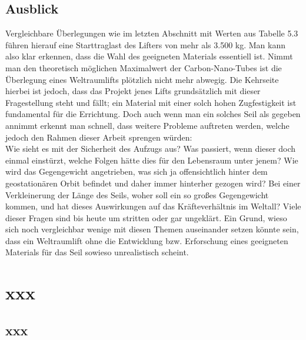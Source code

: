 \documentclass[a4paper, 10pt]{report}
\begin{document}
\section{Ausblick}
Vergleichbare Überlegungen wie im letzten Abschnitt mit Werten aus Tabelle 5.3 führen hierauf eine Starttraglast des Lifters von mehr als 3.500 kg. Man kann also klar erkennen, dass die Wahl des geeigneten Materials essentiell ist. Nimmt man den theoretisch möglichen Maximalwert der Carbon-Nano-Tubes ist die Überlegung eines Weltraumlifts plötzlich nicht mehr abwegig. Die Kehrseite hierbei ist jedoch, dass das Projekt jenes Lifts grundsätzlich mit dieser Fragestellung steht und fällt; ein Material mit einer solch hohen Zugfestigkeit ist fundamental für die Errichtung. Doch auch wenn man ein solches Seil als gegeben annimmt erkennt man schnell, dass weitere Probleme auftreten werden, welche jedoch den Rahmen dieser Arbeit sprengen würden:\\
Wie sieht es mit der Sicherheit des Aufzugs aus? Was passiert, wenn dieser doch einmal einstürzt, welche Folgen hätte dies für den Lebensraum unter jenem? Wie wird das Gegengewicht angetrieben, was sich ja offensichtlich hinter dem geostationären Orbit befindet und daher immer hinterher gezogen wird? Bei einer Verkleinerung der Länge des Seils, woher soll ein so großes Gegengewicht kommen, und hat dieses Auswirkungen auf das Kräfteverhältnis im Weltall? Viele dieser Fragen sind bis heute um stritten oder gar ungeklärt. Ein Grund, wieso sich noch vergleichbar wenige mit diesen Themen auseinander setzen könnte sein, dass ein Weltraumlift ohne die Entwicklung bzw. Erforschung eines geeigneten Materials für das Seil sowieso unrealistisch scheint. 

{}



\appendix
\chapter{xxx}
\section{xxx}
\end{document}
